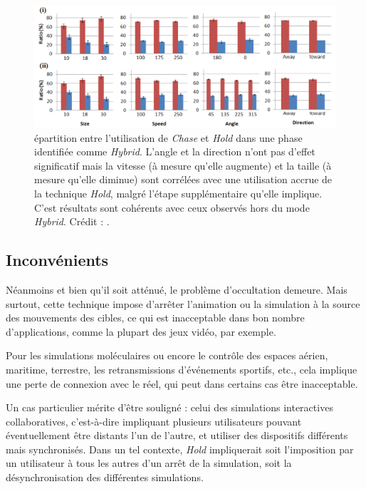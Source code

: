 	\begin{figure}[H]
		\centering
		\includegraphics[width=\textwidth]{figures/ch2/holdRatio}
		\caption[\emph{Hold} --- répartition \emph{Hold/Chase} en mode \emph{Hybrid}]{épartition entre l'utilisation de \emph{Chase} et \emph{Hold} dans une phase identifiée comme \emph{Hybrid}. L'angle et la direction n'ont pas d'effet significatif mais la vitesse (à mesure qu'elle augmente) et la taille (à mesure qu'elle diminue) sont corrélées avec une utilisation accrue de la technique \emph{Hold}, malgré l'étape supplémentaire qu'elle implique. C'est résultats sont cohérents avec ceux observés hors du mode \emph{Hybrid}. Crédit : \cite{hajri2011moving}.}
		\label{fig:holdRatio}
	\end{figure}
	
	\subsection{Inconvénients}
	Néanmoins et bien qu'il soit atténué, le problème d'occultation demeure. Mais surtout, cette technique impose d'arrêter l'animation ou la simulation à la source des mouvements des cibles, ce qui est inacceptable dans bon nombre d'applications, comme la plupart des jeux vidéo, par exemple.
	
	Pour les simulations moléculaires ou encore le contrôle des espaces aérien, maritime, terrestre, les retransmissions d'événements sportifs, etc., cela implique une perte de connexion avec le réel, qui peut dans certains cas être inacceptable.
	
	Un cas particulier mérite d'être souligné : celui des simulations interactives collaboratives, c'est-à-dire impliquant plusieurs utilisateurs pouvant éventuellement être distants l'un de l'autre, et utiliser des dispositifs différents mais synchronisés. Dans un tel contexte, \emph{Hold} impliquerait soit l'imposition par un utilisateur à tous les autres d'un arrêt de la simulation, soit la désynchronisation des différentes simulations.
	
